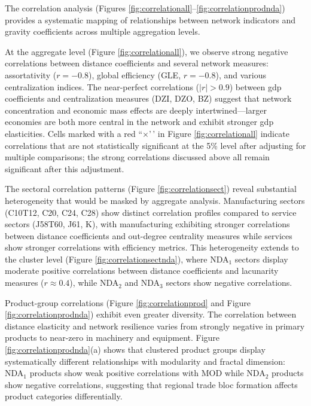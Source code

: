 \documentclass[preprint, 3p,
authoryear]{elsarticle} %
\begin{document}
The correlation analysis (Figures
\ref{fig:correlationall}--\ref{fig:correlationprodnda}) provides a
systematic mapping of relationships between network indicators and
gravity coefficients across multiple aggregation levels.

At the aggregate level (Figure \ref{fig:correlationall}), we observe
strong negative correlations between distance coefficients and several
network measures: assortativity (\(r = -0.8\)), global efficiency (GLE,
\(r = -0.8\)), and various centralization indices. The near-perfect
correlations (\(|r| > 0.9\)) between \gls{gdp} coefficients and
centralization measures (DZI, DZO, BZ) suggest that network
concentration and economic mass effects are deeply intertwined---larger
economies are both more central in the network and exhibit stronger
\gls{gdp} elasticities. Cells marked with a red ``\(\times\)'\,' in
Figure \ref{fig:correlationall} indicate correlations that are not
statistically significant at the 5\% level after adjusting for multiple
comparisons; the strong correlations discussed above all remain
significant after this adjustment.

The sectoral correlation patterns (Figure \ref{fig:correlationsect})
reveal substantial heterogeneity that would be masked by aggregate
analysis. Manufacturing sectors (C10T12, C20, C24, C28) show distinct
correlation profiles compared to service sectors (J58T60, J61, K), with
manufacturing exhibiting stronger correlations between distance
coefficients and out-degree centrality measures while services show
stronger correlations with efficiency metrics. This heterogeneity
extends to the cluster level (Figure \ref{fig:correlationsectnda}),
where NDA\(_1\) sectors display moderate positive correlations between
distance coefficients and lacunarity measures (\(r \approx 0.4\)), while
NDA\(_2\) and NDA\(_3\) sectors show negative correlations.

Product-group correlations (Figure \ref{fig:correlationprod} and Figure
\ref{fig:correlationprodnda}) exhibit even greater diversity. The
correlation between distance elasticity and network resilience varies
from strongly negative in primary products to near-zero in machinery and
equipment. Figure \ref{fig:correlationprodnda}(a) shows that clustered
product groups display systematically different relationships with
modularity and fractal dimension: NDA\(_1\) products show weak positive
correlations with MOD while NDA\(_2\) products show negative
correlations, suggesting that regional trade bloc formation affects
product categories differentially.
\end{document}
